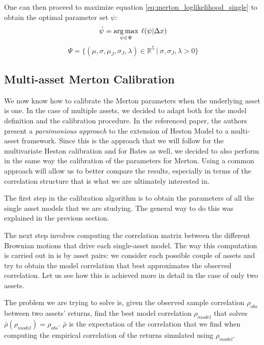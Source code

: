One can then proceed to maximize equation \eqref{eq:merton_loglikelihood_single} to obtain the optimal parameter set $\psi$:
\begin{equation}
\hat{\psi} = \operatorname*{arg\,max}_{\psi \in \Psi} \:\ell(\psi |  \Delta x)
\end{equation}
\begin{equation}
\Psi = \{ (\mu, \sigma, \mu_J, \sigma_J, \lambda) \in \mathbb{R}^5 \: |\: \sigma,\sigma_J, \lambda >0\}
\end{equation}

\subsection{Multi-asset Merton Calibration}
\label{subsec:multi_merton_cal}

We now know  how to calibrate the Merton parameters when the underlying asset is one.
In the case of multiple assets, we decided to adapt \citep{PARSIMONIOUS2011} both for the model definition and the calibration procedure.
In the referenced paper, the authors present a \textit{parsimonious approach} to the extension of Heston Model to a multi-asset framework. Since this is the approach that we will follow for the multivariate Heston calibration and for Bates as well, we decided to also perform in the same way the calibration of the parameters for Merton.
Using a common approach will allow us to better compare the results, especially in terms of the correlation structure that is what we are ultimately interested in.

The first step in the calibration algorithm is to obtain the parameters of all the single asset models that we are studying. The general way to do this was explained in the previous section. 

The next step involves computing the correlation matrix between the different Brownian motions that drive each single-asset model. 
The way this computation is carried out in \citep{PARSIMONIOUS2011} is by asset pairs: we consider each possible couple of assets and try to obtain the model correlation that best approximates the observed correlation.
Let us see how this is achieved more in detail in the case of only two assets.

The problem we are trying to solve is, given the observed sample correlation $\rho_{obs}$ between two assets' returns, find the best model correlation $\rho_{model}$ that solves $\bar{\rho}(\rho_{model}) = \rho_{obs}$.
$\bar{\rho}$ is the expectation of the correlation that we find when computing the  empirical correlation of the returns simulated using $\rho_{model}$.

